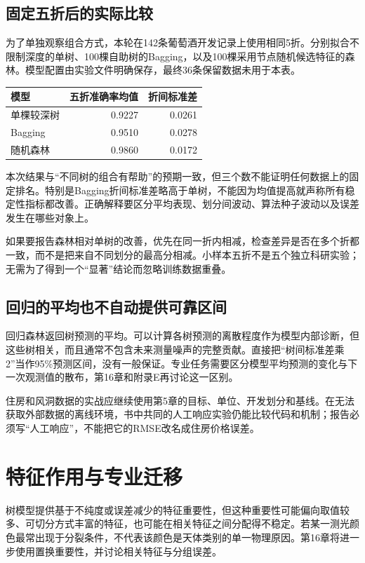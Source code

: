 \subsection{固定五折后的实际比较}
为了单独观察组合方式，本轮在142条葡萄酒开发记录上使用相同5折。分别拟合不限制深度的单树、100棵自助树的Bagging，以及100棵采用节点随机候选特征的森林。模型配置由实验文件明确保存，最终36条保留数据未用于本表。
\begin{center}\small
\begin{tabular}{lrr}\toprule
模型&五折准确率均值&折间标准差\\\midrule
单棵较深树&0.9227&0.0261\\
Bagging&0.9510&0.0278\\
随机森林&0.9860&0.0172\\\bottomrule
\end{tabular}\end{center}
本次结果与“不同树的组合有帮助”的预期一致，但三个数不能证明任何数据上的固定排名。特别是Bagging折间标准差略高于单树，不能因为均值提高就声称所有稳定性指标都改善。正确解释要区分平均表现、划分间波动、算法种子波动以及误差发生在哪些对象上。

如果要报告森林相对单树的改善，优先在同一折内相减，检查差异是否在多个折都一致，而不是把来自不同划分的最高分相减。小样本五折不是五个独立科研实验；无需为了得到一个“显著”结论而忽略训练数据重叠。

\subsection{回归的平均也不自动提供可靠区间}
回归森林返回树预测的平均。可以计算各树预测的离散程度作为模型内部诊断，但这些树相关，而且通常不包含未来测量噪声的完整贡献。直接把“树间标准差乘2”当作95\%预测区间，没有一般保证。专业任务需要区分模型平均预测的变化与下一次观测值的散布，第16章和附录E再讨论这一区别。

住房和风洞数据的实战应继续使用第5章的目标、单位、开发划分和基线。在无法获取外部数据的离线环境，书中共同的人工响应实验仍能比较代码和机制；报告必须写“人工响应”，不能把它的RMSE改名成住房价格误差。

\section{特征作用与专业迁移}
树模型提供基于不纯度或误差减少的特征重要性，但这种重要性可能偏向取值较多、可切分方式丰富的特征，也可能在相关特征之间分配得不稳定。若某一测光颜色最常出现于分裂条件，不代表该颜色是天体类别的单一物理原因。第16章将进一步使用置换重要性，并讨论相关特征与分组误差。

